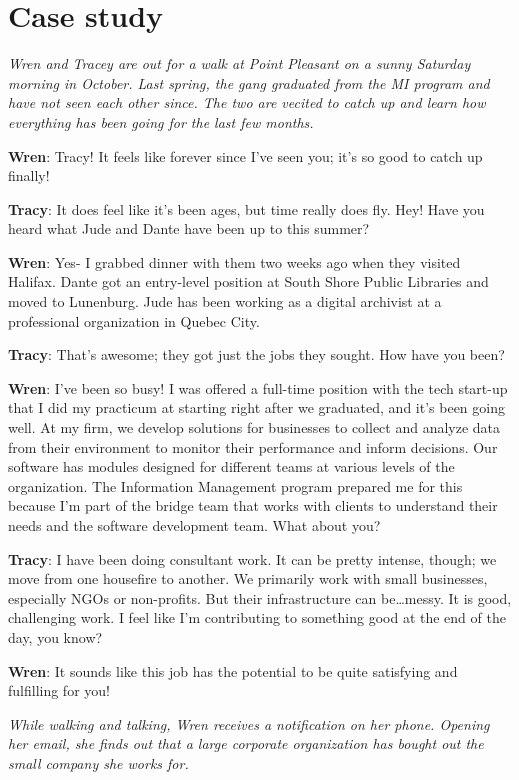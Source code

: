 \documentclass[
  letterpaper,
  DIV=11,
  numbers=noendperiod]{scrreprt}
\begin{document}
\section{Case study}\label{case-study-3}

\emph{Wren and Tracey are out for a walk at Point Pleasant on a sunny
Saturday morning in October. Last spring, the gang graduated from the MI
program and have not seen each other since. The two are vecited to catch
up and learn how everything has been going for the last few months.}

\textbf{Wren}: Tracy! It feels like forever since I've seen you; it's so
good to catch up finally!

\textbf{Tracy}: It does feel like it's been ages, but time really does
fly. Hey! Have you heard what Jude and Dante have been up to this
summer?

\textbf{Wren}: Yes- I grabbed dinner with them two weeks ago when they
visited Halifax. Dante got an entry-level position at South Shore Public
Libraries and moved to Lunenburg. Jude has been working as a digital
archivist at a professional organization in Quebec City.

\textbf{Tracy}: That's awesome; they got just the jobs they sought. How
have you been?

\textbf{Wren}: I've been so busy! I was offered a full-time position
with the tech start-up that I did my practicum at starting right after
we graduated, and it's been going well. At my firm, we develop solutions
for businesses to collect and analyze data from their environment to
monitor their performance and inform decisions. Our software has modules
designed for different teams at various levels of the organization. The
Information Management program prepared me for this because I'm part of
the bridge team that works with clients to understand their needs and
the software development team. What about you?

\textbf{Tracy}: I have been doing consultant work. It can be pretty
intense, though; we move from one housefire to another. We primarily
work with small businesses, especially NGOs or non-profits. But their
infrastructure can be\ldots messy. It is good, challenging work. I feel
like I'm contributing to something good at the end of the day, you know?

\textbf{Wren}: It sounds like this job has the potential to be quite
satisfying and fulfilling for you!

\emph{While walking and talking, Wren receives a notification on her
phone. Opening her email, she finds out that a large corporate
organization has bought out the small company she works for.}
\end{document}
